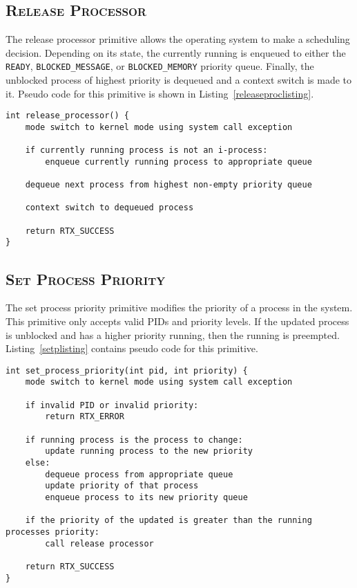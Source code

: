 \documentclass[oneside]{report}
\begin{document}
\subsection{\textsc{Release Processor}}
The release processor primitive allows the operating system to make a
scheduling decision. Depending on its state, the currently running is
enqueued to either the \texttt{READY}, \texttt{BLOCKED\_MESSAGE}, or
\texttt{BLOCKED\_MEMORY} priority queue. Finally, the unblocked process
of highest priority is dequeued and a context switch is made to it. Pseudo code 
for this primitive is shown in Listing~\ref{releaseproclisting}.

\begin{lstlisting}
int release_processor() {
    mode switch to kernel mode using system call exception

    if currently running process is not an i-process:
        enqueue currently running process to appropriate queue

    dequeue next process from highest non-empty priority queue

    context switch to dequeued process
    
    return RTX_SUCCESS
}
\end{lstlisting}

\subsection{\textsc{Set Process Priority}}

The set process priority primitive modifies the priority of a process
in the system. This primitive only accepts valid PIDs and priority
levels. If the updated process is unblocked and has a higher priority
running, then the running is preempted. Listing~\ref{setplisting}
contains pseudo code for this primitive.

\begin{lstlisting}
int set_process_priority(int pid, int priority) {
    mode switch to kernel mode using system call exception
    
    if invalid PID or invalid priority:
        return RTX_ERROR
    
    if running process is the process to change:
        update running process to the new priority
    else:
        dequeue process from appropriate queue
        update priority of that process
        enqueue process to its new priority queue

    if the priority of the updated is greater than the running processes priority:
        call release processor

    return RTX_SUCCESS
}
\end{lstlisting}
\end{document}
